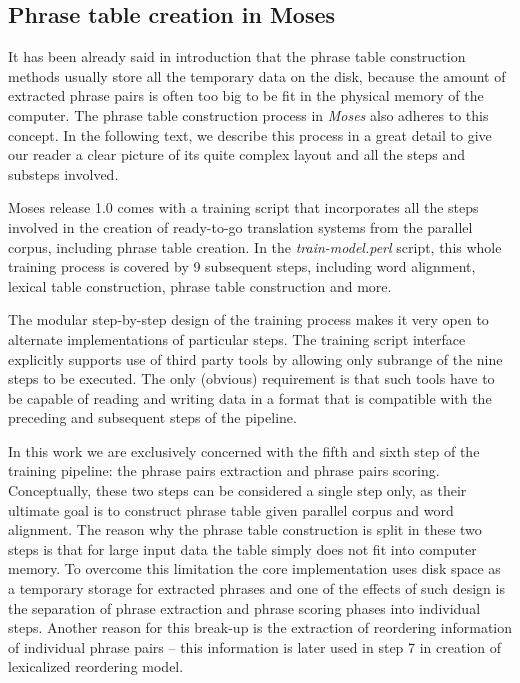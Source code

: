\subsection{Phrase table creation in Moses}
\label{sec:phrase-table-creation-in-moses}

It has been already said in introduction that the phrase table construction methods
usually store all the temporary data on the disk, because the amount of extracted
phrase pairs is often too big to be fit in the physical memory of the computer.
The phrase table construction process in \emph{Moses} also adheres to this concept.
In the following text, we describe this process in a great detail to give our reader
a clear picture of its quite complex layout and all the steps and substeps involved.

Moses release 1.0 comes
with a training script that incorporates all the steps involved in the creation of
ready-to-go translation systems from the parallel corpus, including phrase table creation.
In the \emph{train-model.perl} script, this whole training process is covered by
9 subsequent steps,
including word alignment, lexical table construction, phrase table construction and more.

The modular step-by-step design of the training process makes it very open to
alternate implementations of particular steps.
The training script interface explicitly supports use of third party tools by
allowing only subrange of the nine steps to be executed.
The only (obvious) requirement is that such tools have to be capable of reading and
writing data in a format that is compatible with the preceding and subsequent steps
of the pipeline.

In this work we are exclusively concerned with the fifth and sixth step of
the training pipeline:
the phrase pairs extraction
and phrase pairs scoring.
Conceptually, these two steps can be considered a single step only, as their ultimate
goal is to construct phrase table given parallel corpus and word alignment.
The reason why the phrase table construction is split in these two steps is that
for large input data the table simply does not fit into computer memory.
To overcome this limitation the core implementation uses disk space as a temporary storage
for extracted phrases and one of the effects of such design is the separation of
phrase extraction and phrase scoring phases into individual steps.
Another reason for this break-up is the extraction of reordering information
of individual phrase pairs -- this information is later used in step 7 in creation
of lexicalized reordering model.

